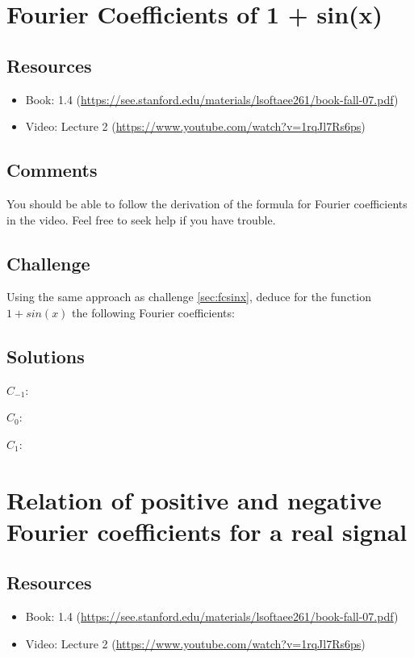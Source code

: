 \section{Fourier Coefficients of 1 + sin(x)}

\subsection*{Resources}
\begin{itemize}
    \item Book: 1.4 (\url{https://see.stanford.edu/materials/lsoftaee261/book-fall-07.pdf})
    \item Video: Lecture 2 (\url{https://www.youtube.com/watch?v=1rqJl7Rs6ps})
\end{itemize}

\subsection*{Comments}
You should be able to follow the derivation of the formula for Fourier coefficients in the video. Feel free to seek help if you have trouble.

\subsection*{Challenge}
Using the same approach as challenge \ref{sec:fcsinx}, deduce for the function $1+sin(x)$ the following Fourier coefficients:

\subsection*{Solutions}
$C_{-1}$: 

$C_0$: 

$C_1$: 

\timebox




\newpage

\section{Relation of positive and negative Fourier coefficients for a real signal}

\subsection*{Resources}
\begin{itemize}
    \item Book: 1.4 (\url{https://see.stanford.edu/materials/lsoftaee261/book-fall-07.pdf})
    \item Video: Lecture 2 (\url{https://www.youtube.com/watch?v=1rqJl7Rs6ps})
\end{itemize}

